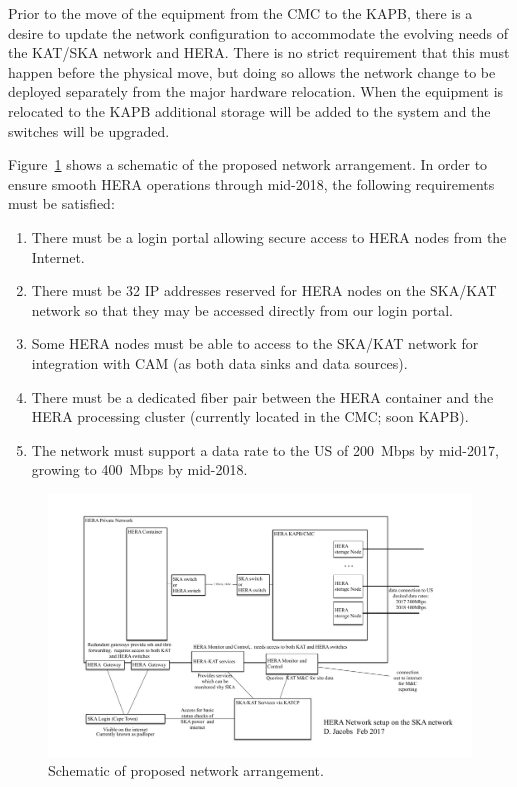 \documentclass{article}
\begin{document}
Prior to the move of the equipment from the CMC to the KAPB, there is a desire
to update the network configuration to accommodate the evolving needs of the
KAT/SKA network and HERA.  There is no strict requirement that this must
happen before the physical move, but doing so allows the network change to be
deployed separately from the major hardware relocation.  When the equipment is relocated to the KAPB additional storage will be added to the system and the switches will be upgraded.



Figure~\ref{fig:net_org} shows a schematic of the proposed network arrangement. In order to ensure smooth HERA operations through mid-2018, the following requirements must be satisfied:
\begin{enumerate}
\item There must be a login portal allowing secure access to HERA nodes from the Internet.
\item There must be 32 IP addresses reserved for HERA nodes on the SKA/KAT network so that they may be accessed directly from our login portal.
\item Some HERA nodes must be able to access to the SKA/KAT network for integration with CAM (as both data sinks and data sources).
\item There must be a dedicated fiber pair between the HERA container and the HERA processing cluster (currently located in the CMC; soon KAPB).
\item The network must support a data rate to the US of 200~Mbps by mid-2017, growing to 400~Mbps by mid-2018.
\end{enumerate}

\begin{figure}[H]
\includegraphics[width=\textwidth]{HERA_2017_network_organization.pdf}
\centering
\caption{Schematic of proposed network arrangement.}
\label{fig:net_org}
\end{figure}
\end{document}
